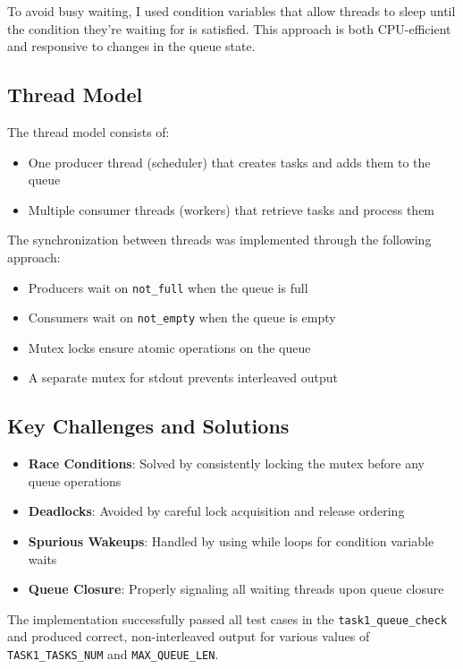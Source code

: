 \documentclass[11pt,a4paper]{article}
\begin{document}
To avoid busy waiting, I used condition variables that allow threads to sleep until the condition they're waiting for is satisfied. This approach is both CPU-efficient and responsive to changes in the queue state.

\subsection{Thread Model}
The thread model consists of:
\begin{itemize}
    \item One producer thread (scheduler) that creates tasks and adds them to the queue
    \item Multiple consumer threads (workers) that retrieve tasks and process them
\end{itemize}

The synchronization between threads was implemented through the following approach:
\begin{itemize}
    \item Producers wait on \texttt{not\_full} when the queue is full
    \item Consumers wait on \texttt{not\_empty} when the queue is empty
    \item Mutex locks ensure atomic operations on the queue
    \item A separate mutex for stdout prevents interleaved output
\end{itemize}

\subsection{Key Challenges and Solutions}
\begin{itemize}
    \item \textbf{Race Conditions}: Solved by consistently locking the mutex before any queue operations
    \item \textbf{Deadlocks}: Avoided by careful lock acquisition and release ordering
    \item \textbf{Spurious Wakeups}: Handled by using while loops for condition variable waits
    \item \textbf{Queue Closure}: Properly signaling all waiting threads upon queue closure
\end{itemize}

The implementation successfully passed all test cases in the \texttt{task1\_queue\_check} and produced correct, non-interleaved output for various values of \texttt{TASK1\_TASKS\_NUM} and \texttt{MAX\_QUEUE\_LEN}.
\end{document}
